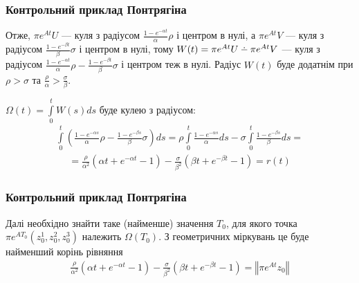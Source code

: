 \documentclass[10pt,pdf,aspectratio=169]{beamer}
\renewcommand{\l}{\left}
\renewcommand{\r}{\right}
\newcommand{\norm}[1]{\left\Vert #1 \right\Vert}
\newcommand{\intl}{\int\limits}
\def\setdif{\mathbin{\ooalign{\hss\raise1ex\hbox{.}\hss\cr
  \mathsurround=0pt$-$}}}
\begin{document}
    \begin{frame}
        \frametitle{Контрольний приклад Понтрягіна}
    
        Отже, $\pi e^{At} U$ --- куля з радіусом $\frac{1 - e^{-\alpha t}}{\alpha}\rho$ і центром в нулі,
        а $\pi e^{At} V$ --- куля з радіусом $\frac{1 - e^{-\beta t}}{\beta}\sigma$ і центром в нулі, тому
        $W(t) = \pi e^{At}U \setdif \pi e^{At}V$ --- куля з радіусом 
        $\frac{1 - e^{-\alpha t}}{\alpha}\rho - \frac{1 - e^{-\beta t}}{\beta}\sigma$ і центром теж в нулі.
        Радіус $W(t)$ буде додатнім при $\rho > \sigma$ та $\frac{\rho}{\alpha} > \frac{\sigma}{\beta}$.
        
        $\Omega(t) = \intl_0^t W(s) ds$ буде кулею
        з радіусом:
        \begin{gather*}
            \intl_0^t \left(\frac{1 - e^{-\alpha s}}{\alpha}\rho - \frac{1 - e^{-\beta s}}{\beta} \sigma\right) ds = 
            \rho \intl_0^t \frac{1 - e^{-\alpha s}}{\alpha} ds - \sigma \intl_0^t \frac{1 - e^{-\beta s}}{\beta} ds =
        \end{gather*}
        \begin{gather*}
            = \frac{\rho}{\alpha^2}\l(\alpha t + e^{-\alpha t} - 1\r) - 
            \frac{\sigma}{\beta^2}\l(\beta t + e^{-\beta t} - 1\r) = r(t)
        \end{gather*}
    
    \end{frame}
    \begin{frame}
        \frametitle{Контрольний приклад Понтрягіна}
    
        Далі необхідно знайти таке (найменше) значення $T_0$, для якого точка $\pi e^{A T_0}(z^1_0, z^2_0, z^3_0)$ належить
        $\Omega(T_0)$. З геометричних міркувань це буде найменший корінь рівняння
        \begin{gather*}
            \frac{\rho}{\alpha^2}\l(\alpha t + e^{-\alpha t} - 1\r) - 
            \frac{\sigma}{\beta^2}\l(\beta t + e^{-\beta t} - 1\r) = \norm{\pi e^{A t} z_0}
        \end{gather*}

    \end{frame}
\end{document}
